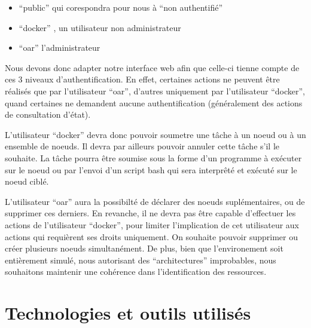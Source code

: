 \documentclass[a4paper,10pt]{article}
\begin{document}
\begin{itemize}
 \item ``public'' qui corespondra pour nous à ``non authentifié''
 \item ``docker'' , un utilisateur non administrateur
 \item ``oar'' l'administrateur
\end{itemize}
\vspace{0.5cm}
Nous devons donc adapter notre interface web afin que celle-ci tienne compte de ces 3 niveaux d'authentification.
En effet, certaines actions ne peuvent être réalisés que par l'utilisateur ``oar'', d'autres uniquement par l'utilisateur ``docker'', quand certaines ne demandent
aucune authentification (généralement des actions de consultation d'état).
\vspace{0.5cm}

L'utilisateur ``docker'' devra donc pouvoir soumetre une tâche à un noeud ou à un ensemble de noeuds.
Il devra par ailleurs pouvoir annuler cette tâche s'il le souhaite. La tâche pourra être soumise sous la forme d'un programme à exécuter sur le noeud
ou par l'envoi d'un script bash qui sera interprêté et exécuté sur le noeud ciblé.
\vspace{0.5cm}

L'utilisateur ``oar'' aura la possibilté de déclarer des noeuds suplémentaires, ou de supprimer ces derniers. En revanche, il ne devra pas être capable d'effectuer les actions
de l'utilisateur ``docker'', pour limiter l'implication de cet utilisateur aux actions qui requièrent ses droits uniquement. On souhaite pouvoir supprimer ou créer plusieurs noeuds
simultanément. De plus, bien que l'environement soit entièrement simulé, nous autorisant des ``architectures'' improbables, nous souhaitons maintenir une cohérence dans l'identification des ressources.

\newpage
\section{Technologies et outils utilisés}
\end{document}
